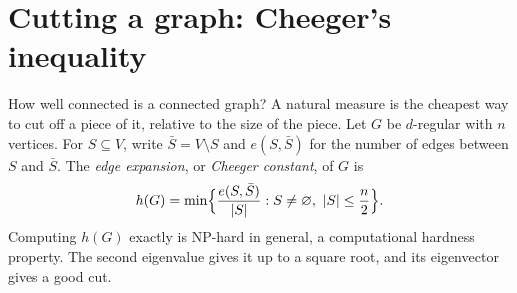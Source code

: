 \section{Cutting a graph: Cheeger's inequality}\label{spectral:sec:cheeger}

How well connected is a connected graph? A natural measure is the cheapest way to cut off a piece of it, relative to the size of the piece. Let $G$ be $d$-regular with $n$
vertices. For $S\subseteq V$, write $\bar S=V\setminus S$ and $e(S,\bar S)$ for the number of edges between $S$ and $\bar S$. The \emph{edge expansion}, or \emph{Cheeger constant}, of $G$ is
\[
h(G)=\min\Bigl\{\frac{e(S,\bar S)}{|S|}:S\ne\varnothing,\ |S|\le\frac n2\Bigr\}.
\]
Computing $h(G)$ exactly is NP-hard in general, a computational hardness property. The second eigenvalue gives it up to a square root, and its eigenvector gives a good cut.

